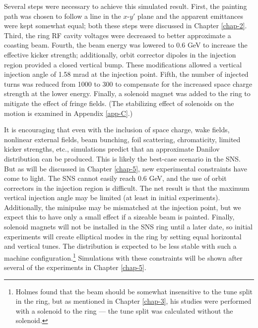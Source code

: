 Several steps were necessary to achieve this simulated result. First, the painting path was chosen to follow a line in the $x$-$y'$ plane and the apparent emittances were kept somewhat equal; both these steps were discussed in Chapter \ref{chap-2}. Third, the ring RF cavity voltages were decreased to better approximate a coasting beam. Fourth, the beam energy was lowered to 0.6 GeV to increase the effective kicker strength; additionally, orbit corrector dipoles in the injection region provided a closed vertical bump. These modifications allowed a vertical injection angle of 1.58 mrad at the injection point. Fifth, the number of injected turns was reduced from 1000 to 300 to compensate for the increased space charge strength at the lower energy. Finally, a solenoid magnet was added to the ring to mitigate the effect of fringe fields. (The stabilizing effect of solenoids on the motion is examined in Appendix \ref{app-C}.)

It is encouraging that even with the inclusion of space charge, wake fields, nonlinear external fields, beam bunching, foil scattering, chromaticity, limited kicker strengths, etc., simulations predict that an approximate Danilov distribution can be produced. This is likely the best-case scenario in the SNS. But as will be discussed in Chapter \ref{chap-5}, new experimental constraints have come to light. The SNS cannot easily reach 0.6 GeV, and the use of orbit correctors in the injection region is difficult. The net result is that the maximum vertical injection angle may be limited (at least in initial experiments). Additionally, the minipulse may be mismatched at the injection point, but we expect this to have only a small effect if a sizeable beam is painted. Finally, solenoid magnets will not be installed in the SNS ring until a later date, so initial experiments will create elliptical modes in the ring by setting equal horizontal and vertical tunes. The distribution is expected to be less stable with such a machine configuration.\footnote{Holmes found that the beam should be somewhat insensitive to the tune split in the ring, but as mentioned in Chapter \ref{chap-3}, his studies were performed with a solenoid to the ring — the tune split was calculated without the solenoid.} Simulations with these constraints will be shown after several of the experiments in Chapter \ref{chap-5}.
